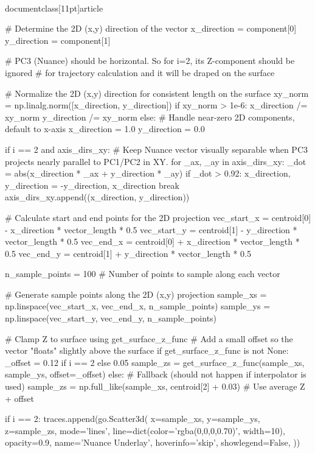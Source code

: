 \\documentclass[11pt]{article}
\begin{document}
\begin{CodeBlock}
{{{        # Determine the 2D (x,y) direction of the vector
        x_direction = component[0]
        y_direction = component[1]
        
        # PC3 (Nuance) should be horizontal. So for i=2, its Z-component should be ignored
        # for trajectory calculation and it will be draped on the surface
        
        # Normalize the 2D (x,y) direction for consistent length on the surface
        xy_norm = np.linalg.norm([x_direction, y_direction])
        if xy_norm > 1e-6:
            x_direction /= xy_norm
            y_direction /= xy_norm
        else: # Handle near-zero 2D components, default to x-axis
            x_direction = 1.0
            y_direction = 0.0

        if i == 2 and axis_dirs_xy:
            # Keep Nuance vector visually separable when PC3 projects nearly parallel to PC1/PC2 in XY.
            for _ax, _ay in axis_dirs_xy:
                _dot = abs(x_direction * _ax + y_direction * _ay)
                if _dot > 0.92:
                    x_direction, y_direction = -y_direction, x_direction
                    break
        axis_dirs_xy.append((x_direction, y_direction))

        # Calculate start and end points for the 2D projection
        vec_start_x = centroid[0] - x_direction * vector_length * 0.5
        vec_start_y = centroid[1] - y_direction * vector_length * 0.5
        vec_end_x = centroid[0] + x_direction * vector_length * 0.5
        vec_end_y = centroid[1] + y_direction * vector_length * 0.5
        
        n_sample_points = 100 # Number of points to sample along each vector

        # Generate sample points along the 2D (x,y) projection
        sample_xs = np.linspace(vec_start_x, vec_end_x, n_sample_points)
        sample_ys = np.linspace(vec_start_y, vec_end_y, n_sample_points)

        # Clamp Z to surface using get_surface_z_func
        # Add a small offset so the vector "floats" slightly above the surface
        if get_surface_z_func is not None:
            _offset = 0.12 if i == 2 else 0.05
            sample_zs = get_surface_z_func(sample_xs, sample_ys, offset=_offset) 
        else:
            # Fallback (should not happen if interpolator is used)
            sample_zs = np.full_like(sample_xs, centroid[2] + 0.03) # Use average Z + offset

        if i == 2:
            traces.append(go.Scatter3d(
                x=sample_xs,
                y=sample_ys,
                z=sample_zs,
                mode='lines',
                line=dict(color='rgba(0,0,0,0.70)', width=10),
                opacity=0.9,
                name='Nuance Underlay',
                hoverinfo='skip',
                showlegend=False,
            ))

}}}
\end{CodeBlock}
\end{document}

